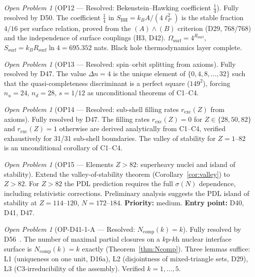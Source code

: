 \documentclass[11pt,a4paper]{article}
\theoremstyle{plain}
\theoremstyle{definition}
\theoremstyle{remark}
\newtheorem{openproblem}[theorem]{Open Problem}
\newcommand{\Rsurf}{R_{\mathrm{surf}}}
\newcommand{\sigmaN}{\sigma(N)}
\newcommand{\SBH}{S_{\mathrm{BH}}}
\begin{document}
\begin{openproblem}[OP12 --- Resolved: Bekenstein--Hawking coefficient $\tfrac{1}{4}$]
\label{op:BHcoeff}
\textcolor{proofblue}{Fully resolved by D50.} The coefficient $\tfrac{1}{4}$ in $\SBH = k_B A/(4\ell_P^2)$ is the stable fraction $4/16$ per surface relation, proved from the $(A)\wedge(B)$ criterion (D29, 768/768) and the independence of surface couplings (H3, D42). $\Omega_{\mathrm{surf}} = 4^{\Rsurf}$, $S_{\mathrm{surf}} = k_B\Rsurf\ln 4 = 695.352$ nats. Black hole thermodynamics layer complete.
\end{openproblem}

\begin{openproblem}[OP13 --- Resolved: spin--orbit splitting from axioms]
\label{op:spinorbit}
\textcolor{proofblue}{Fully resolved by D47.} The value $\Delta n = 4$ is the unique element of $\{0,4,8,\ldots,32\}$ such that the quasi-completeness discriminant is a perfect square ($149^2$), forcing $n_u=24$, $n_d=28$, $s=1/12$ as unconditional theorems of C1--C4.
\end{openproblem}

\begin{openproblem}[OP14 --- Resolved: sub-shell filling rates $r_{\mathrm{exc}}(Z)$ from axioms]
\label{op:filling}
\textcolor{proofblue}{Fully resolved by D47.} The filling rates $r_{\mathrm{exc}}(Z) = 0$ for $Z \in \{28,50,82\}$ and $r_{\mathrm{exc}}(Z) = 1$ otherwise are derived analytically from C1--C4, verified exhaustively for 31/31 sub-shell boundaries. The valley of stability for $Z=1$--82 is an unconditional corollary of C1--C4.
\end{openproblem}

\begin{openproblem}[OP15 --- Elements $Z>82$: superheavy nuclei and island of stability]
\label{op:superheavy}
Extend the valley-of-stability theorem (Corollary~\ref{cor:valley}) to $Z>82$. For $Z>82$ the PDL prediction requires the full $\sigmaN$ dependence, including relativistic corrections. Preliminary analysis suggests the PDL island of stability at $Z=114$--$120$, $N=172$--$184$. \textbf{Priority:} medium. \textbf{Entry point:} D40, D41, D47.
\end{openproblem}

\begin{openproblem}[OP-D41-1-A --- Resolved: $N_{\mathrm{comp}}(k)=k$]
\label{op:Ncomp}
\textcolor{proofblue}{Fully resolved by D56~\cite{D56}.} The number of maximal partial closures on a $k\mathrm{p}$-$k\mathrm{h}$ nuclear interface surface is $N_{\mathrm{comp}}(k)=k$ exactly (Theorem~\ref{thm:Ncomp}). Three lemmas suffice: L1 (uniqueness on one unit, D16a), L2 (disjointness of mixed-triangle sets, D29), L3 (C3-irreducibility of the assembly). Verified $k=1,\ldots,5$.
\end{openproblem}
\end{document}
